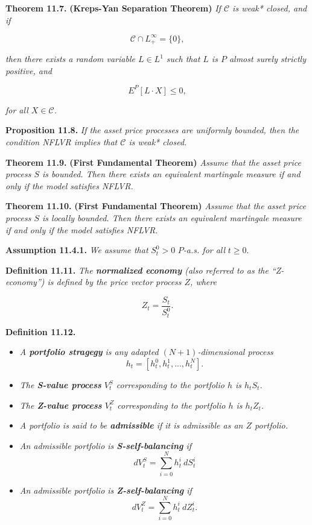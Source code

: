 \documentclass[
]{article}
\providecommand{\tightlist}{%
  \setlength{\itemsep}{0pt}\setlength{\parskip}{0pt}}
\begin{document}
\textbf{Theorem 11.7.} \textbf{(Kreps-Yan Separation Theorem)} \emph{If
\(\mathcal{C}\) is weak* closed, and if}

\[
\mathcal{C}\cap L_+^\infty=\{0\},
\]

\emph{then there exists a random variable \(L\in L^1\) such that \(L\)
is \(P\) almost surely strictly positive, and}

\[
E^P[L\cdot X]\le 0,
\]

\emph{for all \(X\in\mathcal{C}\).}

\textbf{Proposition 11.8.} \emph{If the asset price processes are
uniformly bounded, then the condition NFLVR implies that \(\mathcal{C}\)
is weak* closed.}

\textbf{Theorem 11.9.} \textbf{(First Fundamental Theorem)} \emph{Assume
that the asset price process \(S\) is bounded. Then there exists an
equivalent martingale measure if and only if the model satisfies NFLVR.}

\textbf{Theorem 11.10.} \textbf{(First Fundamental Theorem)}
\emph{Assume that the asset price process \(S\) is locally bounded. Then
there exists an equivalent martingale measure if and only if the model
satisfies NFLVR.}

\textbf{Assumption 11.4.1.} \emph{We assume that }\(S_t^0>0\)
\(P\)\emph{-a.s. for all }\(t\ge 0\).

\textbf{Definition 11.11.} \emph{The \textbf{normalized economy} (also
referred to as the ``Z-economy'') is defined by the price vector process
\(Z\), where}

\[
Z_t=\frac{S_t}{S_t^0}.
\]

\textbf{Definition 11.12.}

\begin{itemize}
\tightlist
\item
  \emph{A \textbf{portfolio stragegy} is any adapted
  \((N+1)\)-dimensional process} \[
    h_t=[h_t^0,h_t^1,...,h_t^N].
    \]
\item
  \emph{The \textbf{S-value process} \(V_t^S\) corresponding to the
  portfolio \(h\) is \(h_tS_t\).}
\item
  \emph{The \textbf{Z-value process} \(V_t^Z\) corresponding to the
  portfolio \(h\) is \(h_tZ_t\).}
\item
  \emph{A portfolio is said to be \textbf{admissible} if it is
  admissible as an \(Z\) portfolio.}
\item
  \emph{An admissible portfolio is \textbf{S-self-balancing} if} \[
    dV_t^S=\sum_{i=0}^Nh_t^i\ dS_t^i\tag{11.26}
    \]
\item
  \emph{An admissible portfolio is \textbf{Z-self-balancing} if} \[
    dV_t^Z=\sum_{i=0}^Nh_t^i\ dZ_t^i.\tag{11.28}
    \]
\end{itemize}
\end{document}
